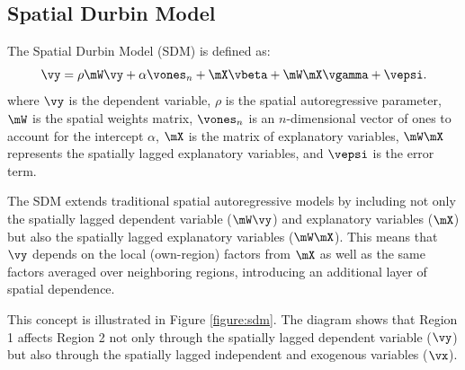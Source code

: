 \documentclass[english,12pt]{book}\usepackage[]{graphicx}\usepackage[]{xcolor}
\begin{document}
\subsection{Spatial Durbin Model}

The Spatial Durbin Model (SDM) is defined as:
\begin{equation}\label{eq:Sdm}
\vy  =  \rho \mW\vy + \alpha \vones_n + \mX\vbeta + \mW\mX\vgamma + \vepsi.
\end{equation}
%
where $\vy$ is the dependent variable, $\rho$ is the spatial autoregressive parameter, $\mW$ is the spatial weights matrix, $\vones_n$ is an $n$-dimensional vector of ones to account for the intercept $\alpha$, $\mX$ is the matrix of explanatory variables, $\mW\mX$ represents the spatially lagged explanatory variables, and $\vepsi$ is the error term.

The SDM extends traditional spatial autoregressive models by including not only the spatially lagged dependent variable ($\mW\vy$) and explanatory variables ($\mX$) but also the spatially lagged explanatory variables ($\mW\mX$). This means that $\vy$ depends on the local (own-region) factors from $\mX$ as well as the same factors averaged over neighboring regions, introducing an additional layer of spatial dependence.

This concept is illustrated in Figure \ref{figure:sdm}. The diagram shows that Region 1 affects Region 2 not only through the spatially lagged dependent variable ($\vy$) but also through the spatially lagged independent and exogenous variables ($\vx$).
\end{document}
